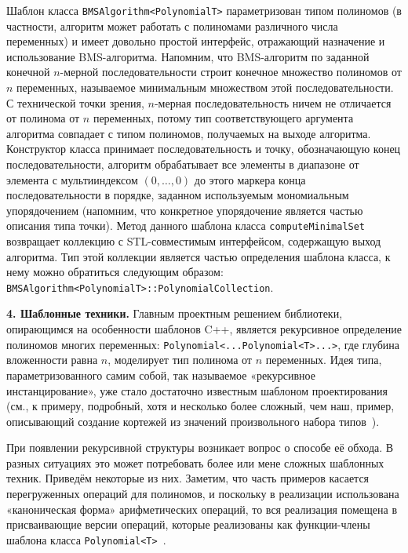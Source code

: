 \documentclass[14pt]{extarticle}
\newcommand{\nspace}{\hspace{0pt}}
\newcommand{\nbdash}{\nobreakdash-\nspace}
\begin{document}
Шаблон класса \lstinline$BMSAlgorithm<PolynomialT>$ параметризован типом
полиномов (в частности, алгоритм может работать с полиномами различного числа
переменных) и имеет довольно простой интерфейс, отражающий назначение и
использование BMS\nbdash{}алгоритма. Напомним, что BMS\nbdash{}алгоритм по
заданной конечной $n$\nbdash{}мерной последовательности строит конечное множество
полиномов от $n$ переменных, называемое минимальным множеством этой
последовательности. С технической точки зрения, $n$\nbdash{}мерная
последовательность ничем не отличается от полинома от $n$ переменных, потому тип
соответствующего аргумента алгоритма совпадает с типом полиномов, получаемых на
выходе алгоритма. Конструктор класса принимает последовательность и точку,
обозначающую конец последовательности, алгоритм обрабатывает все элементы в
диапазоне от элемента с мультииндексом $(0, \ldots, 0)$ до этого маркера конца
последовательности в порядке, заданном используемым мономиальным упорядочением
(напомним, что конкретное упорядочение является частью описания типа точки).
Метод данного шаблона класса \lstinline$computeMinimalSet$ возвращает коллекцию с
STL-совместимым интерфейсом, содержащую выход алгоритма. Тип этой коллекции
является частью определения шаблона класса, к нему можно обратиться следующим
образом:
\lstinline$BMSAlgorithm<PolynomialT>::PolynomialCollection$.

\textbf{4. Шаблонные техники.} Главным проектным решением библиотеки,
опирающимся на особенности шаблонов C++, является рекурсивное определение полиномов многих
переменных: \lstinline$Polynomial<...Polynomial<T>...>$, где глубина вложенности
равна $n$, моделирует тип полинома от $n$ переменных. Идея типа,
параметризованного самим собой, так называемое «рекурсивное инстанцирование»,
уже стало достаточно известным шаблоном проектирования (см., к примеру,
подробный, хотя и несколько более сложный, чем наш, пример, описывающий создание кортежей из значений произвольного набора
типов~\cite[гл.~21]{VJ03}). 

При появлении рекурсивной структуры возникает вопрос о способе её обхода. В
разных ситуациях это может потребовать более или мене сложных шаблонных техник.
Приведём некоторые из них. Заметим, что часть примеров
касается перегруженных операций для полиномов, и поскольку в
реализации использована «каноническая форма» арифметических операций, то вся 
реализация помещена в присваивающие версии операций, которые
реализованы как функции-члены шаблона класса
\lstinline$Polynomial<T>$~\cite[п.~27]{SA05}.
\end{document}
